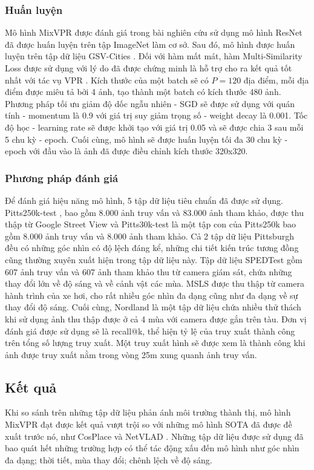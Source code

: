 \subsubsection{Huấn luyện}
Mô hình MixVPR được đánh giá trong bài nghiên cứu sử dụng mô hình ResNet \cite{he2016deep} đã được huấn luyện trên tập ImageNet \cite{krizhevsky2012imagenet} làm cơ sở. Sau đó, mô hình được huấn luyện trên tập dữ liệu GSV-Cities \cite{Ali_bey_2022}. Đối với hàm mất mát, hàm Multi-Similarity Loss \cite{wang2019multi} được sử dụng với lý do đã được chứng minh là hỗ trợ cho ra kết quả tốt nhất với tác vụ VPR \cite{Ali_bey_2022}. Kích thước của một batch sẽ có $P = 120$ địa điểm, mỗi địa điểm được miêu tả bởi 4 ảnh, tạo thành một batch có kích thước 480 ảnh. Phương pháp tối ưu giảm độ dốc ngẫu nhiên - SGD sẽ được sử dụng với quán tính - momentum là 0.9 với giá trị suy giảm trọng số - weight decay là 0.001. Tốc độ học - learning rate sẽ được khởi tạo với giá trị 0.05 và sẽ được chia 3 sau mỗi 5 chu kỳ - epoch. Cuối cùng, mô hình sẽ được huấn luyện tối đa 30 chu kỳ - epoch với đầu vào là ảnh đã được điều chỉnh kích thước 320x320.

\subsubsection{Phương pháp đánh giá}
Để đánh giá hiệu năng mô hình, 5 tập dữ liệu tiêu chuẩn đã được sử dụng. Pitts250k-test \cite{6618963}, bao gồm 8.000 ảnh truy vấn và 83.000 ảnh tham khảo, được thu thập từ Google Street View và Pitts30k-test \cite{6618963} là một tập con của Pitts250k bao gồm 8.000 ảnh truy vấn và 8.000 ảnh tham khảo. Cả 2 tập dữ liệu Pittsburgh đều có những góc nhìn có độ lệch đáng kể, những chi tiết kiến trúc tương đồng cũng thường xuyên xuất hiện trong tập dữ liệu này. Tập dữ liệu SPEDTest \cite{zaffar2021vpr} gồm 607 ảnh truy vấn và 607 ảnh tham khảo thu từ camera giám sát, chứa những thay đổi lớn về độ sáng và về cảnh vật các mùa. MSLS \cite{warburg2020mapillary} được thu thập từ camera hành trình của xe hơi, cho rất nhiều góc nhìn đa dạng cũng như đa dạng về sự thay đổi độ sáng. Cuối cùng, Nordland \cite{zaffar2021vpr} là một tập dữ liệu chứa nhiều thử thách khi sử dụng ảnh thu thập được ở cả 4 mùa với camera được gắn trên tàu. Đơn vị đánh giá được sử dụng sẽ là recall@k, thể hiện tỷ lệ của truy xuất thành công trên tổng số lượng truy xuất. Một truy xuất hình sẽ được xem là thành công khi ảnh được truy xuất nằm trong vòng 25m xung quanh ảnh truy vấn.

\subsection{Kết quả}
Khi so sánh trên những tập dữ liệu phản ánh môi trường thành thị, mô hình MixVPR đạt được kết quả vượt trội so với những mô hình SOTA đã được đề xuất trước nó, như CosPlace \cite{berton2022rethinking} và NetVLAD \cite{arandjelovic2016netvlad}. Những tập dữ liệu được sử dụng đã bao quát hết những trường hợp có thể tác động xấu đến mô hình như góc nhìn đa dạng; thời tiết, mùa thay đổi; chênh lệch về độ sáng.


